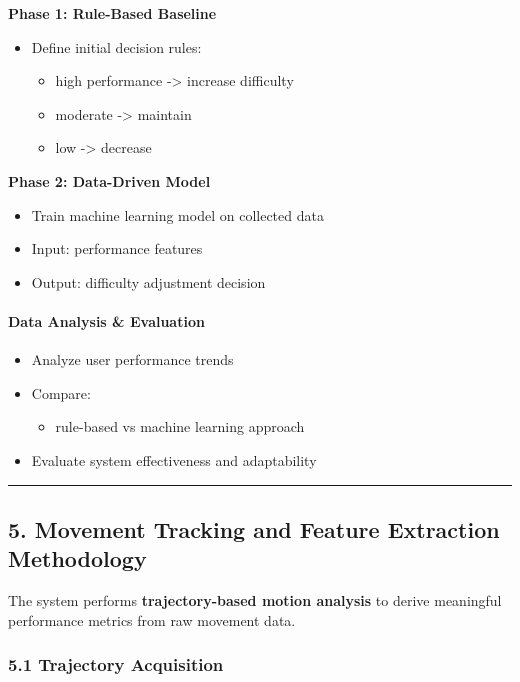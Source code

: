 \documentclass[11pt]{article}
\begin{document}
\textbf{Phase 1: Rule-Based Baseline}

\begin{itemize}
\item Define initial decision rules:
\begin{itemize}
\item high performance -> increase difficulty
\item moderate -> maintain
\item low -> decrease
\end{itemize}
\end{itemize}

\textbf{Phase 2: Data-Driven Model}

\begin{itemize}
\item Train machine learning model on collected data
\item Input: performance features
\item Output: difficulty adjustment decision
\end{itemize}

\paragraph*{Data Analysis \& Evaluation}

\begin{itemize}
\item Analyze user performance trends
\item Compare:
\begin{itemize}
\item rule-based vs machine learning approach
\end{itemize}
\item Evaluate system effectiveness and adaptability
\end{itemize}

\hrule


\subsection*{5. Movement Tracking and Feature Extraction Methodology}


The system performs \textbf{trajectory-based motion analysis} to derive meaningful performance metrics from raw movement data.


\subsubsection*{5.1 Trajectory Acquisition}
\end{document}
